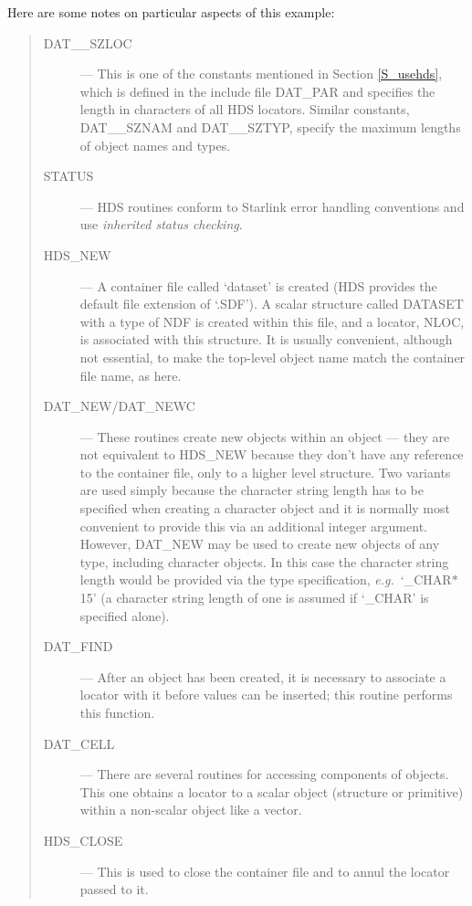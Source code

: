Here are some notes on particular aspects of this example: 

\begin{quote}
\begin{description}

\item [DAT\_\_SZLOC] ---
This is one of the constants mentioned in Section \ref{S_usehds}, which is 
defined in the include file DAT\_PAR and specifies the length in characters of
all HDS locators.
Similar constants, DAT\_\_SZNAM and DAT\_\_SZTYP, specify the maximum lengths of
object names and types. 

\item [STATUS] ---
HDS routines conform to Starlink error handling conventions and use
{\em inherited status checking}.

\item [HDS\_NEW] ---
A container file called `dataset' is created (HDS provides the default file
extension of `.SDF').
A scalar structure called DATASET with a type of NDF is created within this
file, and a locator, NLOC, is associated with this structure.
It is usually convenient, although not essential, to make the top-level object
name match the container file name, as here.

\item [DAT\_NEW/DAT\_NEWC] ---
These routines create new objects within an object --- they are not
equivalent to HDS\_NEW because they don't have any reference to the
container file, only to a higher level structure.
Two variants are used simply because the character string length has to be
specified when creating a character object and it is normally most convenient
to provide this via an additional integer argument.
However, DAT\_NEW may be used to create new objects of any type, including
character objects.
In this case the character string length would be provided via the type
specification, {\em e.g.}\ `\_CHAR$*$15' (a character string length of one
is assumed if `\_CHAR' is specified alone). 

\item [DAT\_FIND] ---
After an object has been created, it is necessary to associate a locator with
it before values can be inserted; this routine performs this function. 

\item [DAT\_CELL] ---
There are several routines for accessing components of objects.
This one obtains a locator to a scalar object (structure or primitive) within
a non-scalar object like a vector. 

\item [HDS\_CLOSE] ---
This is used to close the container file and to annul the locator passed to
it.

\end{description}
\end{quote}

